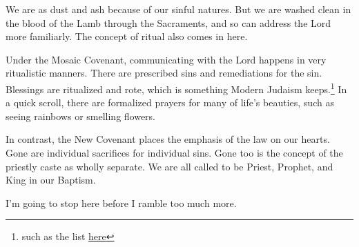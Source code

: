 \documentclass[12pt]{article}[titlepage]
\newcommand{\1}{\={a}}
\newcommand{\2}{\={e}}
\newcommand{\3}{\={\i}}
\newcommand{\4}{\=o}
\newcommand{\5}{\=u}
\newcommand{\6}{\={A}}
\renewcommand{\,}{\textsuperscript{,}}
\begin{document}
We are as dust and ash because of our sinful natures.
But we are washed clean in the blood of the Lamb through the Sacraments, and so can address the Lord more familiarly.
The concept of ritual also comes in here.

Under the Mosaic Covenant, communicating with the Lord happens in very ritualistic manners.
There are prescribed sins and remediations for the sin.
Blessings are ritualized and rote, which is something Modern Judaism keeps.\footnote{such as the list \href{https://en.wikipedia.org/wiki/List_of_Jewish_prayers_and_blessings}{here}}
In a quick scroll, there are formalized prayers for many of life's beauties, such as seeing rainbows or smelling flowers.

In contrast, the New Covenant places the emphasis of the law on our hearts.
Gone are individual sacrifices for individual sins.
Gone too is the concept of the priestly caste as wholly separate.
We are all called to be Priest, Prophet, and King in our Baptism.

I'm going to stop here before I ramble too much more. 
\end{document}
